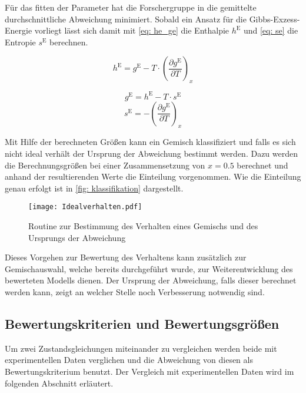 \documentclass[../thesis.tex]{subfiles}
\begin{document}
Für das fitten der Parameter hat die Forschergruppe in \cite{jaubert2020benchmark} die gemittelte durchschnittliche Abweichung minimiert. Sobald ein Ansatz für die Gibbs-Exzess-Energie vorliegt lässt sich damit mit \autoref{eq: he_ge} die Enthalpie $h^{\mathrm{E}}$ und \autoref{eq: se} die Entropie $s^{\mathrm{E}}$ berechnen.

\begin{equation}
	\label{eq: he_ge}
	h^{\mathrm{E}} = g^{\mathrm{E}} - T \cdot \left( \dfrac{\partial g^{\mathrm{E}}}{\partial T} \right)_x
\end{equation}

\begin{equation}
	\label{eq: se_ansatz}
	g^{\mathrm{E}} = h^{\mathrm{E}} - T \cdot s^{\mathrm{E}}
\end{equation}
\begin{equation}
	\label{eq: se}
	s^{\mathrm{E}} = - \left( \dfrac{\partial g^{\mathrm{E}}}{\partial T} \right)_x
\end{equation}

Mit Hilfe der berechneten Größen kann ein Gemisch klassifiziert und falls es sich nicht ideal verhält der Ursprung der Abweichung bestimmt werden. Dazu werden die Berechnungsgrößen bei einer Zusammensetzung von $x=\text{0.5}$ berechnet und anhand der resultierenden Werte die Einteilung vorgenommen. Wie die Einteilung genau erfolgt ist in \autoref{fig: klassifikation} dargestellt.

\begin{figure}[htbp]
	\centering
	\texttt{[image: Idealverhalten.pdf]}
	\caption{Routine zur Bestimmung des Verhalten eines Gemischs und des Ursprungs der Abweichung}
	\label{fig: klassifikation}
\end{figure}

Dieses Vorgehen zur Bewertung des Verhaltens kann zusätzlich zur Gemischauswahl, welche bereits durchgeführt wurde, zur Weiterentwicklung des bewerteten Modells dienen. Der Ursprung der Abweichung, falls dieser berechnet werden kann, zeigt an welcher Stelle noch Verbesserung notwendig sind.  

\subsection{Bewertungskriterien und Bewertungsgrößen}

Um zwei Zustandsgleichungen miteinander zu vergleichen werden beide mit experimentellen Daten verglichen und die Abweichung von diesen als Bewertungskriterium benutzt. Der Vergleich mit experimentellen Daten wird im folgenden Abschnitt erläutert.
\end{document}
